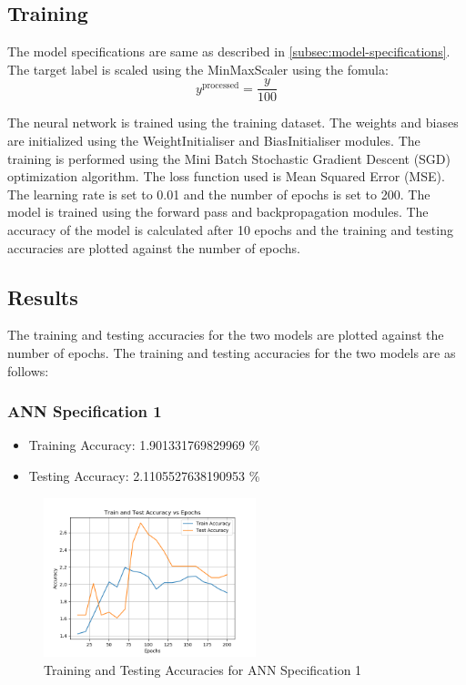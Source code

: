 \documentclass[12pt]{article}
\begin{document}
\subsection{Training}
The model specifications are same as described in \ref{subsec:model-specifications}. The target label is scaled using the MinMaxScaler using the fomula:
\[
    y^{\mathrm{processed}} = \frac{y}{100}
\]

The neural network is trained using the training dataset. The weights and biases are initialized using the WeightInitialiser and BiasInitialiser modules. The training is performed using the Mini Batch Stochastic Gradient Descent (SGD) optimization algorithm. The loss function used is Mean Squared Error (MSE). The learning rate is set to 0.01 and the number of epochs is set to 200. The model is trained using the forward pass and backpropagation modules. The accuracy of the model is calculated after 10 epochs and the training and testing accuracies are plotted against the number of epochs.
\subsection{Results}
The training and testing accuracies for the two models are plotted against the number of epochs. The training and testing accuracies for the two models are as follows:
\subsubsection{ANN Specification 1}
\begin{itemize}
	\item Training Accuracy: 1.901331769829969 \%
	\item Testing Accuracy: 2.1105527638190953 \%

\end{itemize}
\begin{figure}[H]
    \centering
    \includegraphics[width=0.55\textwidth]{Model_layer_32_1.png}
    \caption{Training and Testing Accuracies for ANN Specification 1}
    \label{fig:ann1}
\end{figure}
\end{document}
